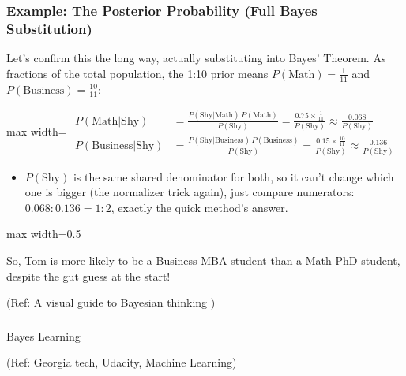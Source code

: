 \begin{frame}[fragile]\frametitle{Example: The Posterior Probability (Full Bayes Substitution)}
Let's confirm this the long way, actually substituting into Bayes' Theorem. As fractions of the total population, the 1:10 prior means $P(\text{Math})=\tfrac{1}{11}$ and $P(\text{Business})=\tfrac{10}{11}$:
\begin{center}
\begin{adjustbox}{max width=\linewidth}
$\begin{aligned}
P(\text{Math}|\text{Shy}) &= \frac{P(\text{Shy}|\text{Math})\,P(\text{Math})}{P(\text{Shy})} = \frac{0.75 \times \frac{1}{11}}{P(\text{Shy})} \approx \frac{0.068}{P(\text{Shy})}\\
P(\text{Business}|\text{Shy}) &= \frac{P(\text{Shy}|\text{Business})\,P(\text{Business})}{P(\text{Shy})} = \frac{0.15 \times \frac{10}{11}}{P(\text{Shy})} \approx \frac{0.136}{P(\text{Shy})}
\end{aligned}$
\end{adjustbox}
\end{center}
\begin{itemize}
\item $P(\text{Shy})$ is the same shared denominator for both, so it can't change which one is bigger (the normalizer trick again), just compare numerators: $0.068 : 0.136 = 1:2$, exactly the quick method's answer.
\end{itemize}
\begin{center}
\begin{adjustbox}{max width=0.5\linewidth}
\end{adjustbox}

{\small So, Tom is more likely to be a Business MBA student than a Math PhD student, despite the gut guess at the start!}
\end{center}

{\tiny (Ref: A visual guide to Bayesian thinking )}
\end{frame}

\begin{frame}[fragile]\frametitle{}
\begin{center}
{\Large Bayes Learning}

{\tiny (Ref: Georgia tech, Udacity, Machine Learning)}

\end{center}


\end{frame}

